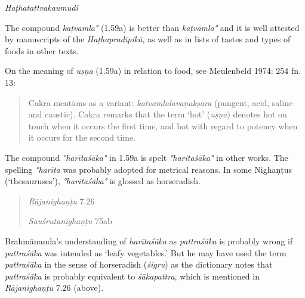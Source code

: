 \begin{ekdosis}
\begin{testimonia}[hp01_059]
\emph{Haṭhatattvakaumudī}

\begin{versinnote}
\end{versinnote}

\end{testimonia}

\begin{philcomm}[hp01_059]
The compound \emph{kaṭvamla°} (1.59a) is better than \emph{kaṭvāmla°} and it is well attested by manuscripts of the \emph{Haṭhapradīpikā}, as well as in lists of tastes and types of foods in other texts.

On the meaning of \emph{uṣṇa} (1.59a) in relation to food, see Meulenbeld 1974: 254 fn. 13:
\begin{quote}
Cakra mentions as a variant: \emph{katvamlalavaṇakṣāra} (pungent, acid, saline and caustic). Cakra remarks that the term `hot' (\emph{uṣṇa}) denotes hot on touch when it occurs the first time, and hot with regard to potency when it occurs for the second time.
\end{quote}

The compound \emph{°harītaśāka°} in 1.59a is spelt \emph{°haritaśāka°} in other works. The spelling \emph{°harīta} was probably adopted for metrical reasons. In some Nighaṇṭus (`thesauruses'), \emph{°haritaśāka°} is glossed as horseradish.
\begin{quote}
\emph{Rājanighaṇṭu} 7.26

\begin{versinnote}
\end{versinnote}
\emph{Sauśrutanighaṇṭu} 75ab
\begin{versinnote}
\end{versinnote}
\end{quote}

Brahmānanda’s understanding of \emph{harītaśāka} as \emph{pattraśāka} is probably wrong if \emph{pattraśāka} was intended as ‘leafy vegetables.’ But he may have used the term \emph{pattraśāka} in the sense of horseradish (\emph{śigru}) as the dictionary notes that \emph{pattraśāka} is probably equivalent to \emph{śākapattra}, which is mentioned in \emph{Rājanighaṇṭu} 7.26 (above).


\end{philcomm}
\end{ekdosis}
